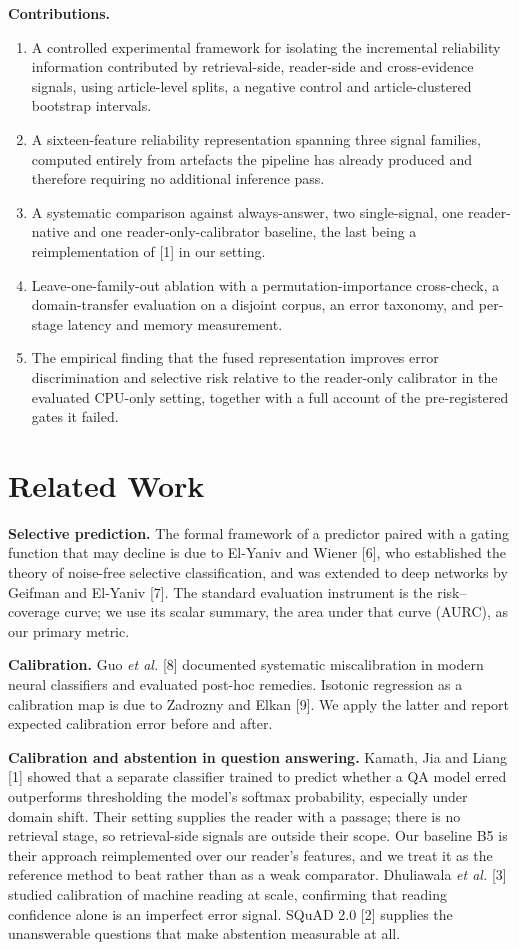 \documentclass[conference]{IEEEtran}
\begin{document}
\textbf{Contributions.}

\begin{enumerate}\itemsep0pt
\item A controlled experimental framework for isolating the incremental reliability information contributed by retrieval-side, reader-side and cross-evidence signals, using article-level splits, a negative control and article-clustered bootstrap intervals.
\item A sixteen-feature reliability representation spanning three signal families, computed entirely from artefacts the pipeline has already produced and therefore requiring no additional inference pass.
\item A systematic comparison against always-answer, two single-signal, one reader-native and one reader-only-calibrator baseline, the last being a reimplementation of [1] in our setting.
\item Leave-one-family-out ablation with a permutation-importance cross-check, a domain-transfer evaluation on a disjoint corpus, an error taxonomy, and per-stage latency and memory measurement.
\item The empirical finding that the fused representation improves error discrimination and selective risk relative to the reader-only calibrator in the evaluated CPU-only setting, together with a full account of the pre-registered gates it failed.
\end{enumerate}

\section{Related Work}

\textbf{Selective prediction.} The formal framework of a predictor paired with a gating function that may decline is due to El-Yaniv and Wiener [6], who established the theory of noise-free selective classification, and was extended to deep networks by Geifman and El-Yaniv [7]. The standard evaluation instrument is the risk--coverage curve; we use its scalar summary, the area under that curve (AURC), as our primary metric.

\textbf{Calibration.} Guo \emph{et al.} [8] documented systematic miscalibration in modern neural classifiers and evaluated post-hoc remedies. Isotonic regression as a calibration map is due to Zadrozny and Elkan [9]. We apply the latter and report expected calibration error before and after.

\textbf{Calibration and abstention in question answering.} Kamath, Jia and Liang [1] showed that a separate classifier trained to predict whether a QA model erred outperforms thresholding the model's softmax probability, especially under domain shift. Their setting supplies the reader with a passage; there is no retrieval stage, so retrieval-side signals are outside their scope. Our baseline B5 is their approach reimplemented over our reader's features, and we treat it as the reference method to beat rather than as a weak comparator. Dhuliawala \emph{et al.} [3] studied calibration of machine reading at scale, confirming that reading confidence alone is an imperfect error signal. SQuAD 2.0 [2] supplies the unanswerable questions that make abstention measurable at all.
\end{document}
